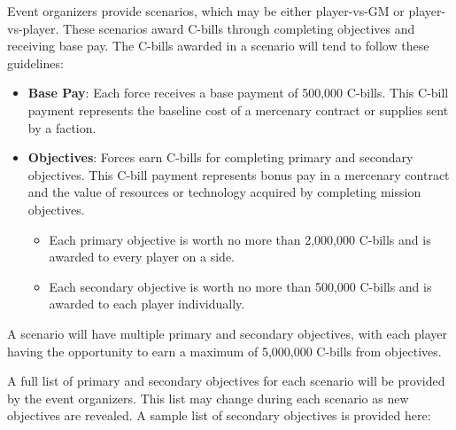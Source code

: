 Event organizers provide scenarios, which may be either player-vs-GM or player-vs-player.
These scenarios award C-bills through completing objectives and receiving base pay.
The C-bills awarded in a scenario will tend to follow these guidelines:

\begin{itemize}

\item {\bfseries Base Pay}: Each force receives a base payment of 500,000 C-bills.
This C-bill payment represents the baseline cost of a mercenary contract or supplies sent by a faction.

\item {\bfseries Objectives}: Forces earn C-bills for completing primary and secondary objectives.
This C-bill payment represents bonus pay in a mercenary contract and the value of resources or technology acquired by completing mission objectives.

\begin{itemize}

\item Each primary objective is worth no more than 2,000,000 C-bills and is awarded to every player on a side.

\item Each secondary objective is worth no more than 500,000 C-bills and is awarded to each player individually.

\end{itemize}

\end{itemize}

A scenario will have multiple primary and secondary objectives, with each player having the opportunity to earn a maximum of 5,000,000 C-bills from objectives.

A full list of primary and secondary objectives for each scenario will be provided by the event organizers.
This list may change during each scenario as new objectives are revealed.
A sample list of secondary objectives is provided here:


